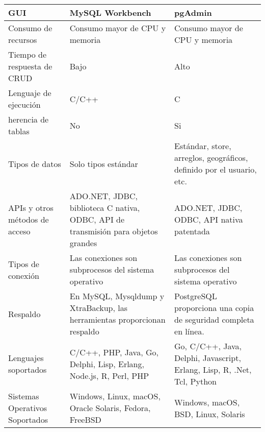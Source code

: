 \begin{longtable}{|p{3cm}|p{5cm}|p{5cm}|}
    \hline \hline
    \endlastfoot
    GUI                                            & MySQL Workbench                                                                   & pgAdmin                                                                 \\\hline
    Consumo de recursos                            & Consumo mayor de CPU y memoria                                                    & Consumo mayor de CPU y memoria                                          \\\hline
    Tiempo de respuesta de CRUD                    & Bajo                                                                              & Alto                                                                    \\\hline
    Lenguaje de ejecución                          & C/C++                                                                             & C                                                                       \\\hline
    herencia de tablas                             & No                                                                                & Si                                                                      \\\hline
    Tipos de datos                                 & Solo tipos estándar                                                               & Estándar, store, arreglos, geográficos, definido por el usuario, etc.   \\\hline
    APIs y otros métodos de acceso                 & ADO.NET, JDBC, biblioteca C nativa, ODBC, API de transmisión para objetos grandes & ADO.NET, JDBC, ODBC, API nativa patentada                               \\\hline
    Tipos de conexión                              & Las conexiones son subprocesos del sistema operativo                              & Las conexiones son subprocesos del sistema operativo                    \\\hline
    Respaldo                                       & En MySQL, Mysqldump y XtraBackup, las herramientas proporcionan respaldo          & PostgreSQL proporciona una copia de seguridad completa en línea.        \\\hline
    Lenguajes soportados                           & C/C++, PHP, Java, Go, Delphi, Lisp, Erlang, Node.js, R, Perl, PHP                 & Go, C/C++, Java, Delphi, Javascript, Erlang, Lisp, R, .Net, Tcl, Python \\\hline
    Sistemas Operativos Soportados                 & Windows, Linux, macOS, Oracle Solaris, Fedora, FreeBSD                            & Windows, macOS, BSD, Linux, Solaris                                     \\
\end{longtable}